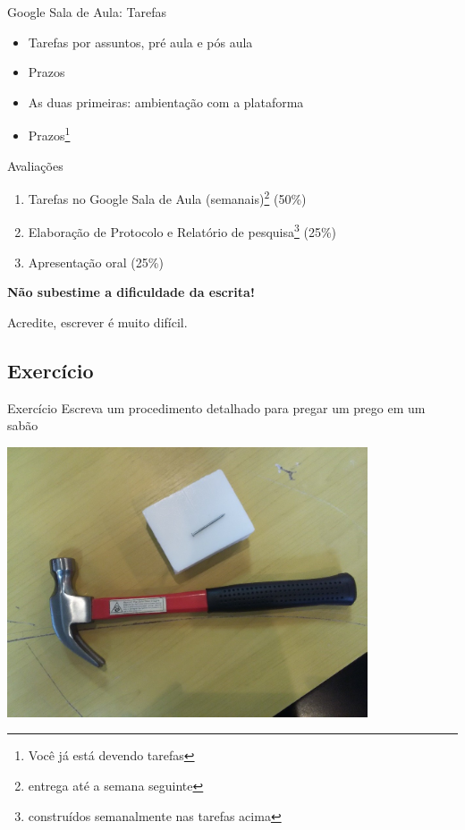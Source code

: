 \documentclass{beamer}
\begin{document}
\begin{frame}{Google Sala de Aula: Tarefas}
  \begin{itemize}
    \small
  \item Tarefas por assuntos, pré aula e pós aula
    \bigskip
  \item Prazos
    \bigskip
  \item As duas primeiras: ambientação com a plataforma
    \bigskip
  \item Prazos\footnote{Você já está devendo tarefas}
  \end{itemize}
\end{frame}

\begin{frame}{Avaliações}
  \begin{enumerate}
    \small
  \item Tarefas no Google Sala de Aula (semanais)\footnote{entrega até a semana seguinte} (50\%)
    \bigskip
  \item Elaboração de Protocolo e Relatório de pesquisa\footnote{construídos semanalmente nas tarefas acima} (25\%)
    \bigskip
  \item Apresentação oral (25\%)
  \end{enumerate}
\end{frame}


\begin{frame}{}
  \begin{block}{}
    {\bf Não subestime a dificuldade da escrita!}

    \bigskip
    Acredite, escrever é muito difícil.
  \end{block}

  \bigskip
  \bigskip
\end{frame}

\subsection{Exercício}

\begin{frame}{Exercício}
Escreva um procedimento detalhado para pregar um prego em um sabão

  \begin{center}
    \includegraphics[width=0.8\textwidth]{Intro/pregomartelo}
  \end{center}
\end{frame}
\end{document}
